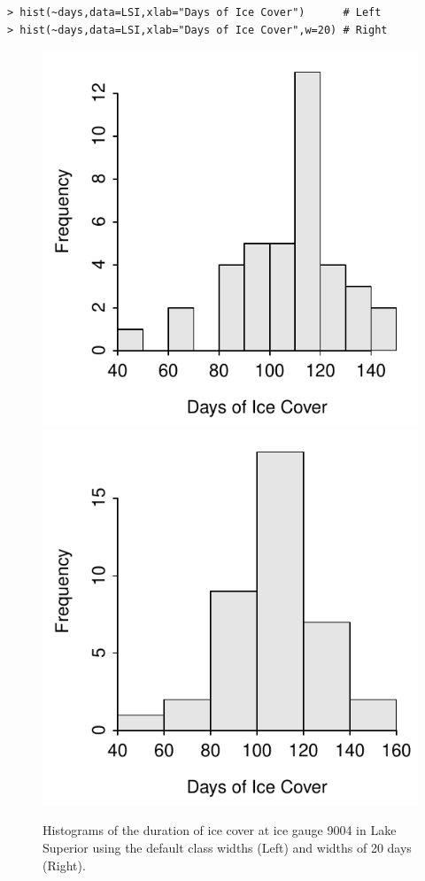 \documentclass[10pt,openany]{book}\usepackage[]{graphicx}\usepackage[]{color}
\makeatletter
\newenvironment{kframe}{%
 \def\at@end@of@kframe{}%
 \ifinner\ifhmode%
  \def\at@end@of@kframe{\end{minipage}}%
  \begin{minipage}{\columnwidth}%
 \fi\fi%
 \def\FrameCommand##1{\hskip\@totalleftmargin \hskip-\fboxsep
 \colorbox{shadecolor}{##1}\hskip-\fboxsep
     \hskip-\linewidth \hskip-\@totalleftmargin \hskip\columnwidth}%
 \MakeFramed {\advance\hsize-\width
   \@totalleftmargin\z@ \linewidth\hsize
   \@setminipage}}%
 {\par\unskip\endMakeFramed%
 \at@end@of@kframe}
\newenvironment{knitrout}{}{} %
\makeatother
\begin{document}
\begin{knitrout}
\color{fgcolor}\begin{kframe}
\begin{verbatim}
> hist(~days,data=LSI,xlab="Days of Ice Cover")      # Left
> hist(~days,data=LSI,xlab="Days of Ice Cover",w=20) # Right
\end{verbatim}
\end{kframe}\begin{figure}[hbtp]

{\centering \includegraphics[width=.4\linewidth]{Figs/Histogram1-1} 
\includegraphics[width=.4\linewidth]{Figs/Histogram1-2} 

}

\caption[Histograms of the duration of ice cover at ice gauge 9004 in Lake Superior using the default class widths (Left) and widths of 20 days (Right)]{Histograms of the duration of ice cover at ice gauge 9004 in Lake Superior using the default class widths (Left) and widths of 20 days (Right).}\label{fig:Histogram1}
\end{figure}


\end{knitrout}

\end{document}
